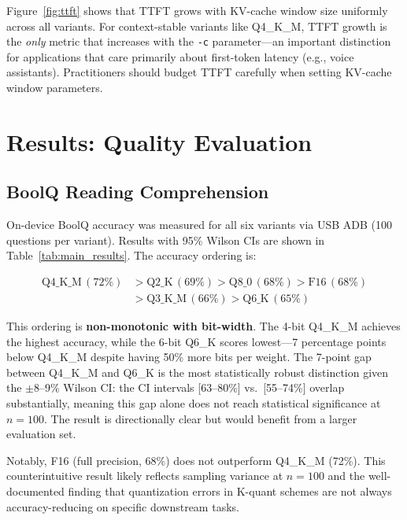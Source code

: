 \documentclass[conference]{IEEEtran}
\begin{document}
Figure~\ref{fig:ttft} shows that TTFT grows with KV-cache window size
uniformly across all variants. For context-stable variants like Q4\_K\_M,
TTFT growth is the \emph{only} metric that increases with the \texttt{-c}
parameter---an important distinction for applications that care primarily
about first-token latency (e.g., voice assistants). Practitioners should
budget TTFT carefully when setting KV-cache window parameters.

\section{Results: Quality Evaluation}
\label{sec:quality}

\subsection{BoolQ Reading Comprehension}

On-device BoolQ accuracy was measured for all six variants via USB ADB
(100 questions per variant). Results with 95\% Wilson CIs are shown in
Table~\ref{tab:main_results}. The accuracy ordering is:

\begin{align*}
  \text{Q4\_K\_M}\,(72\%) &> \text{Q2\_K}\,(69\%) > \text{Q8\_0}\,(68\%) > \text{F16}\,(68\%) \\
                          &> \text{Q3\_K\_M}\,(66\%) > \text{Q6\_K}\,(65\%)
\end{align*}

This ordering is \textbf{non-monotonic with bit-width}. The 4-bit Q4\_K\_M
achieves the highest accuracy, while the 6-bit Q6\_K scores lowest---7 percentage
points below Q4\_K\_M despite having 50\% more bits per weight. The 7-point gap
between Q4\_K\_M and Q6\_K is the most statistically robust distinction given
the $\pm$8--9\% Wilson CI: the CI intervals [63--80\%] vs.\ [55--74\%] overlap
substantially, meaning this gap alone does not reach statistical significance
at $n{=}100$. The result is directionally clear but would benefit from a larger
evaluation set.

Notably, F16 (full precision, 68\%) does not outperform Q4\_K\_M (72\%).
This counterintuitive result likely reflects sampling variance at $n{=}100$
and the well-documented finding that quantization errors in K-quant schemes
are not always accuracy-reducing on specific downstream tasks.
\end{document}
